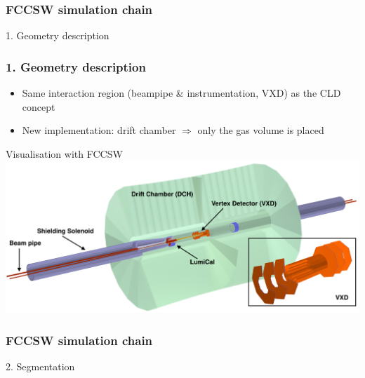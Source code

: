 \documentclass[aspectratio=169, hyperref={colorlinks=true,pdfpagelabels=false,linkcolor=black}, xcolor=dvipsnames,10pt]{beamer}
\begin{document}
\begin{frame}
	\frametitle{FCCSW simulation chain}
	
    \centering

	\vspace{1cm}
	\centering
	\Huge{1. Geometry description}
\end{frame}


\begin{frame}
	\frametitle{1. Geometry description}
	
	\begin{itemize}
	\item Same interaction region (beampipe \& instrumentation, VXD) as the CLD concept
	\item New implementation: drift chamber $\Rightarrow$ only the gas volume is placed
	\end{itemize}
	
	\begin{block}{Visualisation with FCCSW}
	\centering
	\includegraphics[width=\textwidth]{../figures/FCCeeIDEA_IR_description_zoomVXD.png}
	\end{block}

\end{frame}


\begin{frame}
	\frametitle{FCCSW simulation chain}
	
    \centering

	\vspace{1cm}
	\centering
	\Huge{2. Segmentation}
	
\end{frame}
\end{document}
